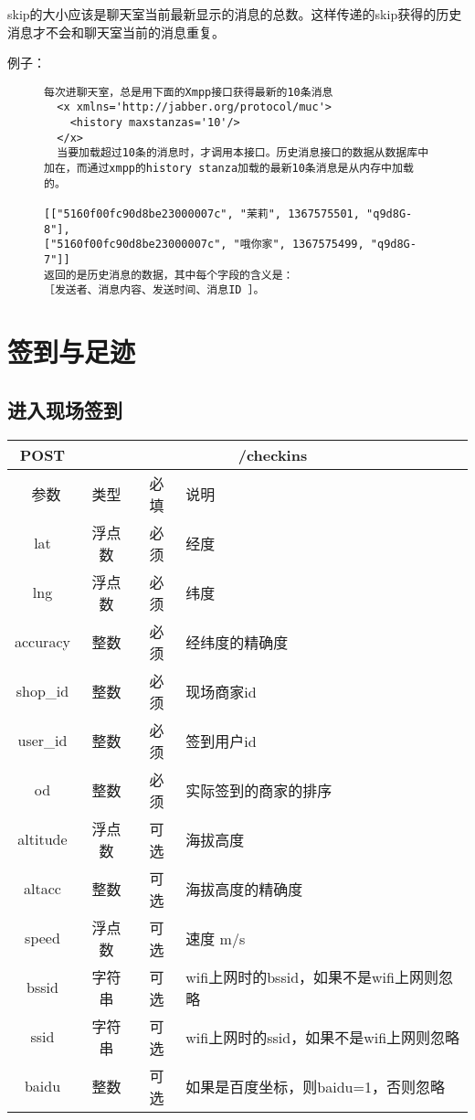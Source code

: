 \documentclass[cs4size]{ctexartutf8}
\begin{document}
skip的大小应该是聊天室当前最新显示的消息的总数。这样传递的skip获得的历史消息才不会和聊天室当前的消息重复。

例子：

\begin{figure}[H]
\begin{verbatim}
每次进聊天室，总是用下面的Xmpp接口获得最新的10条消息
  <x xmlns='http://jabber.org/protocol/muc'>
    <history maxstanzas='10'/>
  </x>
  当要加载超过10条的消息时，才调用本接口。历史消息接口的数据从数据库中加在，而通过xmpp的history stanza加载的最新10条消息是从内存中加载的。
  
[["5160f00fc90d8be23000007c", "茉莉", 1367575501, "q9d8G-8"], 
["5160f00fc90d8be23000007c", "哦你家", 1367575499, "q9d8G-7"]]
返回的是历史消息的数据，其中每个字段的含义是：
［发送者、消息内容、发送时间、消息ID ］。
\end{verbatim}
\end{figure}



\section{签到与足迹}

\subsection{进入现场签到}

\begin{table}[H]
   \begin{center}
\begin{tabular}{|c|c|c|p{12cm}|}
\hline
POST & \multicolumn{3}{|c|}{/checkins} \\
\hline\hline
 \  参数  & 类型 & 必填 &  说明  \\
\hline
 lat  & 浮点数 & 必须 & 经度\\
\hline
 lng  &  浮点数 & 必须 & 纬度\\ 
\hline
 accuracy  & 整数 & 必须 & 经纬度的精确度\\ 
\hline
 shop\_id  & 整数 & 必须 &  现场商家id\\ 
\hline
 user\_id  & 整数 & 必须 &  签到用户id\\ 
\hline
 od  & 整数 & 必须 &  实际签到的商家的排序\\  
\hline
 altitude  &  浮点数 & 可选 & 海拔高度\\ 
\hline
 altacc  & 整数 & 可选 & 海拔高度的精确度\\  
\hline
 speed  & 浮点数 & 可选 & 速度 m/s\\   
\hline
 bssid  & 字符串 & 可选 & wifi上网时的bssid，如果不是wifi上网则忽略\\  
\hline
 ssid  & 字符串 & 可选 & wifi上网时的ssid，如果不是wifi上网则忽略\\  
\hline
 baidu  & 整数 & 可选 & 如果是百度坐标，则baidu=1，否则忽略\\  
\hline
\end{tabular}
   \end{center}
\end{table}
\end{document}
